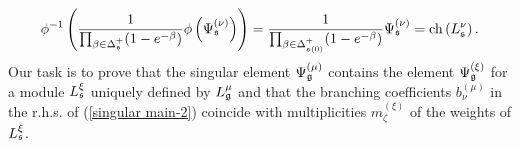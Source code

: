 \documentclass[12pt]{article}
\begin{document}
\begin{equation}
 \phi^{-1}\left( \frac{1}{\prod_{\beta \in \Delta_{\frak{s}} ^{+}}(1-e^{-\beta })}\phi\left(\Psi_{\frak{s}} ^{\left( \nu \right)}\right)\right)
 =
 \frac{1}{\prod_{\beta \in \Delta_{\frak{s}\left(0\right)} ^{+}}(1-e^{-\beta })}\Psi_{\frak{s}} ^{\left( \nu \right)}
 =
 \mathrm{ch}\left( L_{\frak{s}}^{\nu }\right).
\label{inverse for stem}
\end{equation}
Our task is to prove that the singular element $\Psi_{\frak{g}} ^{\left( \mu \right) }$ contains the element $\Psi_{\frak{g}} ^{\left( \xi \right) }$ for a module $L^{\xi}_{\frak{s}}$ uniquely defined by $L^{\mu}_{\frak{g}}$ and that the branching coefficients $b_{\nu }^{(\mu )}$ in the r.h.s. of (\ref{singular main-2})  coincide with multiplicities $m_{\zeta}^{\left( \xi \right) }$ of the weights of $L^{\xi}_{\frak{s}}$. 
\end{document}
